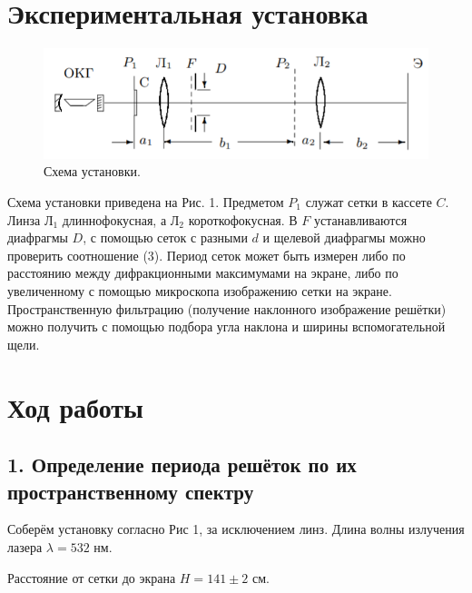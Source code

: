 \documentclass[a4paper, 12pt]{article}%
\begin{document}
\section*{Экспериментальная установка}
\begin{figure}[h]
\includegraphics[scale=0.9]{1.png}
\centering
\caption{Схема установки.}
\centering
\end{figure}
Схема установки приведена на Рис. 1. Предметом $P_1$ служат сетки в кассете $C$. Линза $\text{Л}_1$ длиннофокусная, а $\text{Л}_2$ короткофокусная. В $F$ устанавливаются диафрагмы $D$, с помощью сеток с разными $d$ и щелевой диафрагмы можно проверить соотношение (3). Период сеток может быть измерен либо по расстоянию между дифракционными максимумами на экране, либо по увеличенному с помощью микроскопа изображению сетки на экране. Пространственную фильтрацию (получение наклонного изображение решётки) можно получить с помощью подбора угла наклона и ширины вспомогательной щели.

\textbf{       }

\section*{Ход работы}
\subsection*{1. Определение периода решёток по их пространственному спектру}
Соберём установку согласно Рис 1, за исключением линз. Длина волны излучения лазера $\lambda = 532 \text{ нм}$.\\
\textbf{       }

Расстояние от сетки до экрана $H = 141 \pm 2 \text{ см}$.\\
\textbf{       }
\end{document}
